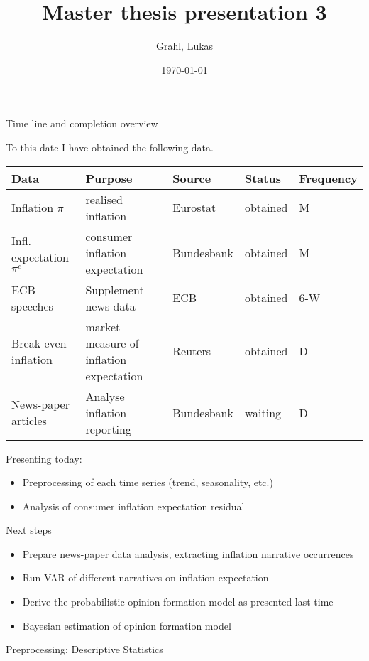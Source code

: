 \documentclass[9pt]{beamer}
\title{Master thesis presentation 3}
\author{Grahl, Lukas}
\institute{Paris 1: Panthéon Sorbonne}
\date{\today}
\begin{document}
	
	\maketitle
	
	\begin{frame}{Time line and completion overview}
		
		To this date I have obtained the following data.
		\begin{center}
			\tiny{
				\begin{tabular}{l|llll}
				Data & Purpose & Source & Status & Frequency \\
				\hline
				Inflation $\pi$& realised inflation & Eurostat & obtained & M \\
				Infl. expectation $\pi^e$ & consumer inflation expectation & Bundesbank & obtained & M \\
				ECB speeches & Supplement news data & ECB & obtained & 6-W \\
				Break-even inflation & market measure of inflation expectation & Reuters & obtained & D \\
				News-paper articles & Analyse inflation reporting & Bundesbank & waiting & D \\							
				\end{tabular}
			}	
		\end{center}	
		Presenting today: 
		\begin{itemize}
				\item Preprocessing of each time series (trend, seasonality, etc.)
				\item Analysis of consumer inflation expectation residual
		\end{itemize}
	
		Next steps
		\begin{itemize}
			\item Prepare news-paper data analysis, extracting inflation narrative occurrences
			\item Run VAR of different narratives on inflation expectation
			\item Derive the probabilistic opinion formation model as presented last time
			\item Bayesian estimation of opinion formation model
		\end{itemize}
		
	\end{frame}

	\begin{frame}{Preprocessing: Descriptive Statistics}
	\end{frame}
\end{document}
